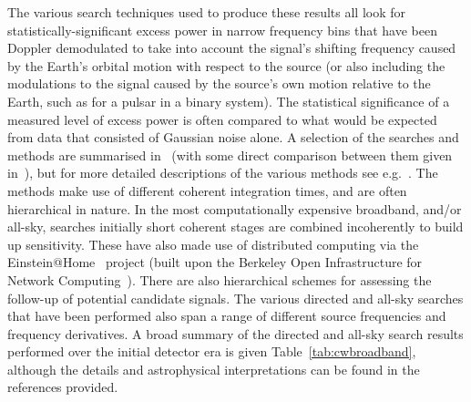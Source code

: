 The various search techniques used to produce these results all look for statistically-significant excess 
power in narrow frequency bins that have been Doppler demodulated to take into account the signal's shifting 
frequency caused by the Earth's orbital motion with respect to the source (or also including the modulations 
to the signal caused by the source's own motion relative to the Earth, such as for a pulsar in a binary 
system). The statistical significance of a measured level of excess power is often compared to what would be 
expected from data that consisted of Gaussian noise alone. A selection of the searches and methods are
summarised in~\cite{Prix:2006} (with some direct comparison between them given 
in~\cite{2016arXiv160600660W}), but for more detailed descriptions of the various methods 
see e.g.~\cite{Brady:2000, Krishnan:2004, Jaranowski:1998, Abbott:2008e, Abbott:2007a, Dupuis:2005}. The 
methods make use of different coherent integration times, and are often hierarchical in nature. In the most 
computationally expensive broadband, and/or all-sky, searches initially short coherent stages are combined 
incoherently to build up sensitivity. These have also made use of distributed computing via the 
Einstein@Home~\cite{eath} project (built upon the Berkeley Open Infrastructure for Network 
Computing~\cite{BOINC}).  There are also hierarchical schemes for assessing the follow-up of potential 
candidate signals. The various directed and all-sky searches that have been performed also span a range of 
different source frequencies and frequency derivatives. A broad summary of the directed and all-sky search 
results performed over the initial detector era is given Table~\ref{tab:cwbroadband}, although the details and 
astrophysical interpretations can be found in the references provided.

